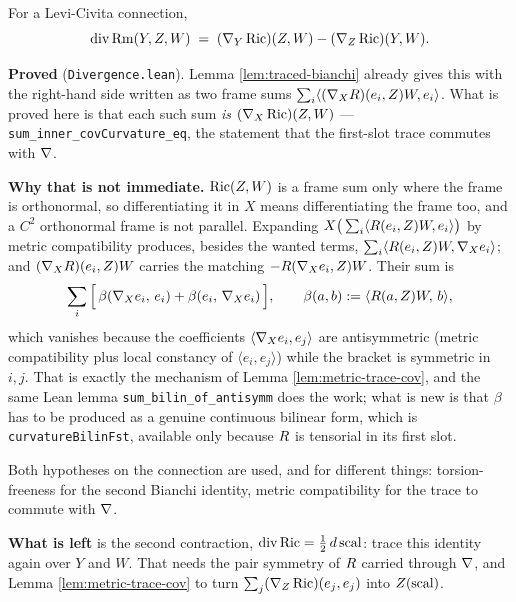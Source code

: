 \begin{theorem}
  \label{thm:contracted-bianchi}
  \leanok
  For a Levi-Civita connection,
  \[
    \operatorname{div}\operatorname{Rm}(Y,Z,W) \;=\; (\nabla_Y\operatorname{Ric})(Z,W) - (\nabla_Z\operatorname{Ric})(Y,W).
  \]

  \textbf{Proved} (\texttt{Divergence.lean}). Lemma \ref{lem:traced-bianchi}
  already gives this with the right-hand side written as two frame sums
  $\sum_i \langle (\nabla_XR)(e_i,Z)W, e_i\rangle$. What is proved here is
  that each such sum \emph{is} $(\nabla_X\operatorname{Ric})(Z,W)$ ---
  \texttt{sum\_inner\_covCurvature\_eq}, the statement that the first-slot trace
  commutes with $\nabla$.

  \textbf{Why that is not immediate.} $\operatorname{Ric}(Z,W)$ is a frame sum only where the
  frame is orthonormal, so differentiating it in $X$ means differentiating the
  frame too, and a $C^2$ orthonormal frame is not parallel. Expanding
  $X\big(\sum_i \langle R(e_i,Z)W, e_i\rangle\big)$ by metric compatibility
  produces, besides the wanted terms, $\sum_i \langle R(e_i,Z)W, \nabla_X
  e_i\rangle$; and $(\nabla_XR)(e_i,Z)W$ carries the matching $-R(\nabla_X
  e_i, Z)W$. Their sum is
  \[
    \sum_i \Big[\,\beta(\nabla_X e_i,\, e_i) + \beta(e_i,\, \nabla_X e_i)\,\Big],
    \qquad \beta(a,b) := \langle R(a,Z)W,\, b\rangle,
  \]
  which vanishes because the coefficients $\langle \nabla_X e_i, e_j\rangle$ are
  antisymmetric (metric compatibility plus local constancy of $\langle e_i,
  e_j\rangle$) while the bracket is symmetric in $i,j$. That is exactly the
  mechanism of Lemma \ref{lem:metric-trace-cov}, and the same Lean lemma
  \texttt{sum\_bilin\_of\_antisymm} does the work; what is new is that $\beta$
  has to be produced as a genuine continuous bilinear form, which is
  \texttt{curvatureBilinFst}, available only because $R$ is tensorial in its
  first slot.

  Both hypotheses on the connection are used, and for different things:
  torsion-freeness for the second Bianchi identity, metric compatibility for the
  trace to commute with $\nabla$.

  \textbf{What is left} is the second contraction, $\operatorname{div}\operatorname{Ric} =
  \tfrac12\, d\operatorname{scal}$: trace this identity again over $Y$ and $W$. That needs the
  pair symmetry of $R$ carried through $\nabla$, and Lemma
  \ref{lem:metric-trace-cov} to turn $\sum_j (\nabla_Z\operatorname{Ric})(e_j,e_j)$ into
  $Z(\operatorname{scal})$.
\end{theorem}

